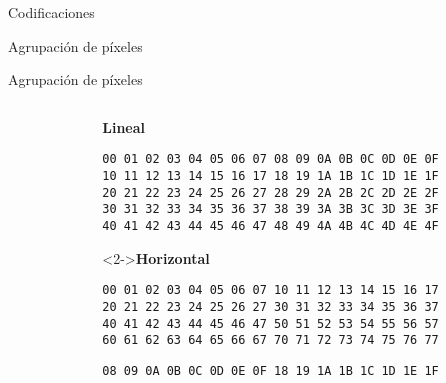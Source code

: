 \begin{frame}{Codificaciones}
\end{frame}

\begin{frame}{Agrupación de píxeles}
    \centering
\end{frame}

\begin{frame}[fragile]{Agrupación de píxeles}
    \begin{columns}
    \begin{column}{0.1\textwidth}
    \end{column}
    \begin{column}{0.9\textwidth}
        {\textbf{Lineal}}
        \begin{lstlisting}[basicstyle=\ttfamily\footnotesize]
00 01 02 03 04 05 06 07 08 09 0A 0B 0C 0D 0E 0F
10 11 12 13 14 15 16 17 18 19 1A 1B 1C 1D 1E 1F
20 21 22 23 24 25 26 27 28 29 2A 2B 2C 2D 2E 2F
30 31 32 33 34 35 36 37 38 39 3A 3B 3C 3D 3E 3F
40 41 42 43 44 45 46 47 48 49 4A 4B 4C 4D 4E 4F
        \end{lstlisting}
        \begin{uncoverenv}<2->{\textbf{Horizontal}}
        \begin{lstlisting}[basicstyle=\ttfamily\footnotesize\color{red},
            belowskip=-0.5\baselineskip]
00 01 02 03 04 05 06 07 10 11 12 13 14 15 16 17
20 21 22 23 24 25 26 27 30 31 32 33 34 35 36 37
40 41 42 43 44 45 46 47 50 51 52 53 54 55 56 57
60 61 62 63 64 65 66 67 70 71 72 73 74 75 76 77\end{lstlisting}
        \begin{lstlisting}[basicstyle=\ttfamily\footnotesize\color{blue}]
08 09 0A 0B 0C 0D 0E 0F 18 19 1A 1B 1C 1D 1E 1F
        \end{lstlisting}\end{uncoverenv}
    \end{column}
    \end{columns}
\end{frame}

